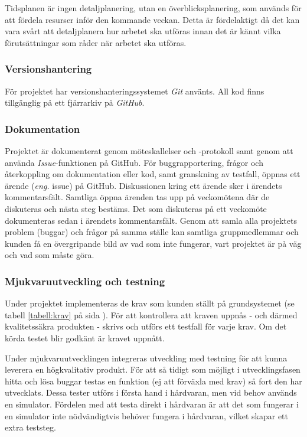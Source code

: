 Tidsplanen är ingen detaljplanering, utan en överblicksplanering, som används för att fördela resurser inför den kommande veckan. Detta är fördelaktigt då det kan vara svårt att detaljplanera hur arbetet ska utföras innan det är kännt vilka förutsättningar som råder när arbetet ska utföras.

\subsubsection{Versionshantering}
För projektet har versionshanteringssystemet \textit{Git} använts. All kod finns tillgänglig på ett fjärrarkiv på \textit{GitHub}.

\subsubsection{Dokumentation}

Projektet är dokumenterat genom möteskallelser och -protokoll samt genom att använda \textit{Issue}-funktionen på GitHub. För buggrapportering, frågor och återkoppling om dokumentation eller kod, samt granskning av testfall, öppnas ett ärende (\textit{eng.} issue) på GitHub. Diskussionen kring ett ärende sker i ärendets kommentarsfält. Samtliga öppna ärenden tas upp på veckomötena där de diskuteras och nästa steg bestäms. Det som diskuteras på ett veckomöte dokumenteras sedan i ärendets kommentarsfält. Genom att samla alla projektets problem (buggar) och frågor på samma ställe kan samtliga gruppmedlemmar och kunden få en övergripande bild av vad som inte fungerar, vart projektet är på väg och vad som måste göra. 

\subsubsection{Mjukvaruutveckling och testning}

Under projektet implementeras de krav som kunden ställt på grundsystemet (se tabell \ref{tabell:krav} på sida \pageref{tabell:krav}). För att kontrollera att kraven uppnås - och därmed kvalitetssäkra produkten - skrivs och utförs ett testfall för varje krav. Om det körda testet blir godkänt är kravet uppnått.

Under mjukvaruutvecklingen integreras utveckling med testning för att kunna leverera en högkvalitativ produkt. För att så tidigt som möjligt i utvecklingsfasen hitta och lösa buggar testas en funktion (ej att förväxla med krav) så fort den har utvecklats. Dessa tester utförs i första hand i hårdvaran, men vid behov används en simulator. Fördelen med att testa direkt i hårdvaran är att det som fungerar i en simulator inte nödvändigtvis behöver fungera i hårdvaran, vilket skapar ett extra teststeg.


